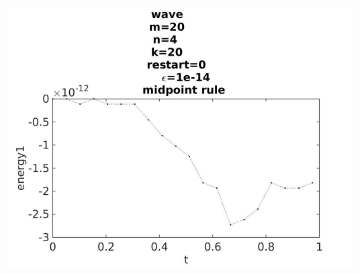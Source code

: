 \begin{figure}[H]
\begin{subfigure}[b]{0.30\textwidth}
                \includegraphics[width=\textwidth]{../MATLAB/fig/energyovertimemidpoint.jpg}
                \caption{  }
                \label{fig:errormid}
        \end{subfigure}
        

\end{figure}

